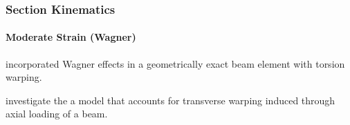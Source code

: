 \subsubsection{Section Kinematics}
\paragraph{Moderate Strain (Wagner)}
\cite{rong2020geometrically} incorporated Wagner effects in a geometrically exact beam element with torsion warping.

\cite{chadha2019comprehensive} investigate the a model that accounts for transverse warping induced through axial loading of a beam.

